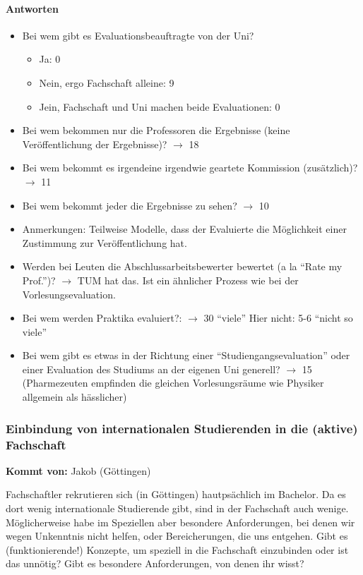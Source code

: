       \paragraph{Antworten}
        \begin{itemize}
          \item Bei wem gibt es Evaluationsbeauftragte von der Uni?
            \begin{itemize}
              \item Ja: 0
              \item Nein, ergo Fachschaft alleine: 9
              \item Jein, Fachschaft und Uni machen beide Evaluationen: 0
            \end{itemize}
          \item Bei wem bekommen nur die Professoren die Ergebnisse (keine Veröffentlichung der Ergebnisse)? $\rightarrow$ 18
          \item Bei wem bekommt es irgendeine irgendwie geartete Kommission (zusätzlich)? $\rightarrow$ 11
          \item Bei wem bekommt jeder die Ergebnisse zu sehen? $\rightarrow$ 10
          \item Anmerkungen: Teilweise Modelle, dass der Evaluierte die Möglichkeit einer Zustimmung zur Veröffentlichung hat.
          \item Werden bei Leuten die Abschlussarbeitsbewerter bewertet (a la “Rate my Prof.”)?
            $\rightarrow$ TUM hat das. Ist ein ähnlicher Prozess wie bei der Vorlesungsevaluation.
          \item Bei wem werden Praktika evaluiert?: $\rightarrow$ 30 “viele”
          Hier nicht: 5-6 “nicht so viele”
          \item Bei wem gibt es etwas in der Richtung einer “Studiengangsevaluation” oder einer Evaluation des Studiums an der eigenen Uni generell? $\rightarrow$ 15 (Pharmezeuten empfinden die gleichen Vorlesungsräume wie Physiker allgemein als hässlicher)
        \end{itemize}

    \subsubsection*{Einbindung von internationalen Studierenden in die (aktive) Fachschaft}
      \textbf{Kommt von:} Jakob (Göttingen)

      Fachschaftler rekrutieren sich (in Göttingen) hautpsächlich im Bachelor. Da es dort wenig internationale Studierende gibt, sind in der Fachschaft auch wenige. Möglicherweise habe im Speziellen aber besondere Anforderungen, bei denen wir wegen Unkenntnis nicht helfen, oder Bereicherungen, die uns entgehen. Gibt es (funktionierende!) Konzepte, um speziell in die Fachschaft einzubinden oder ist das unnötig?
      Gibt es besondere Anforderungen, von denen ihr wisst?

